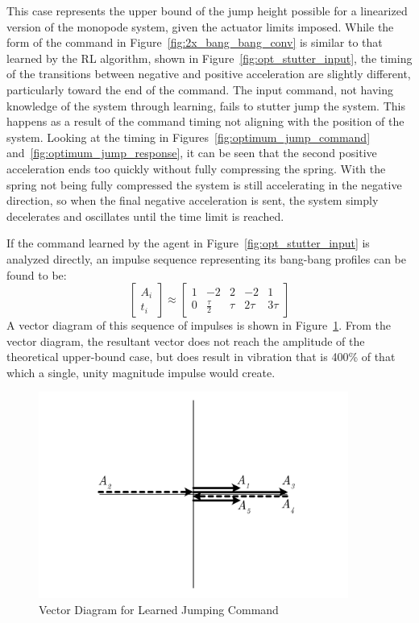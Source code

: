 This case represents the upper bound of the jump height possible for a linearized version of the monopode system, given the actuator limits imposed. While the form of the command in Figure~\ref{fig:2x_bang_bang_conv} is similar to that learned by the RL algorithm, shown in Figure~\ref{fig:opt_stutter_input}, the timing of the transitions between negative and positive acceleration are slightly different, particularly toward the end of the command. The input command, not having knowledge of the system through learning, fails to stutter jump the system. This happens as a result of the command timing not aligning with the position of the system. Looking at the timing in Figures~\ref{fig:optimum_jump_command} and~\ref{fig:optimum_jump_response}, it can be seen that the second positive acceleration ends too quickly without fully compressing the spring. With the spring not being fully compressed the system is still accelerating in the negative direction, so when the final negative acceleration is sent, the system simply decelerates and oscillates until the time limit is reached.

If the command learned by the agent in Figure~\ref{fig:opt_stutter_input} is analyzed directly, an impulse sequence representing its bang-bang profiles can be found to be:
%
\begin{equation}
\begin{bmatrix}A_i \\t_i\end{bmatrix} \approx \begin{bmatrix}1 & -2 & 2 & -2 & 1 \\[3pt] 0 & \frac{\tau}{2} & \tau & 2\tau & 3\tau \end{bmatrix}
\label{eqn:rl_match_impulses}
\end{equation}
%
A vector diagram of this sequence of impulses is shown in Figure~\ref{fig:rl_match_vector}. From the vector diagram, the resultant vector does not reach the amplitude of the theoretical upper-bound case, but does result in vibration that is 400\% of that which a single, unity magnitude impulse would create.
%
\begin{figure}[tb!]
\begin{center}
\includegraphics[width = 4in]{Figures/Ch3/input_shaping/rl_bang_bang_vector.pdf}
\caption{Vector Diagram for Learned Jumping Command}
\label{fig:rl_match_vector}
\end{center}
\vspace{-0.2in}
\end{figure}
%


